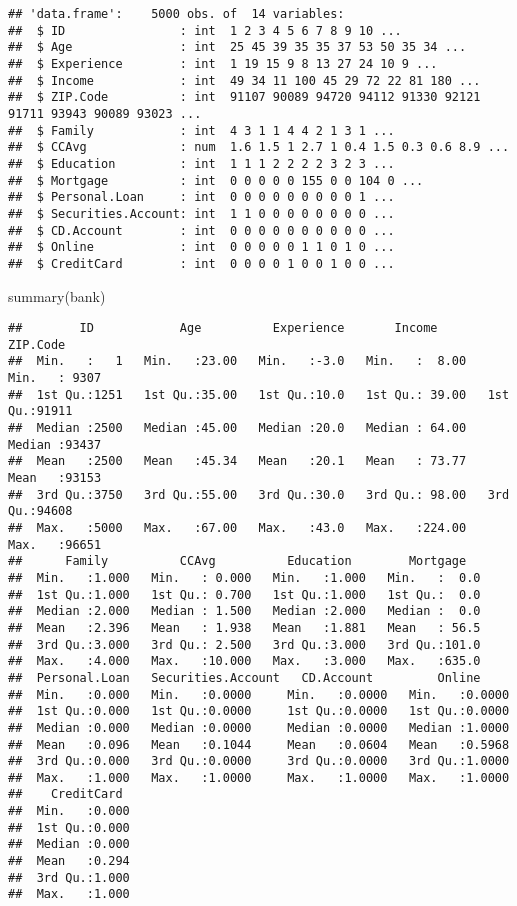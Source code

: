 \documentclass[
]{article}
\newenvironment{Shaded}{\begin{snugshade}}{\end{snugshade}}
\newcommand{\FunctionTok}[1]{\textcolor[rgb]{0.00,0.00,0.00}{#1}}
\newcommand{\NormalTok}[1]{#1}
\begin{document}
\begin{verbatim}
## 'data.frame':    5000 obs. of  14 variables:
##  $ ID                : int  1 2 3 4 5 6 7 8 9 10 ...
##  $ Age               : int  25 45 39 35 35 37 53 50 35 34 ...
##  $ Experience        : int  1 19 15 9 8 13 27 24 10 9 ...
##  $ Income            : int  49 34 11 100 45 29 72 22 81 180 ...
##  $ ZIP.Code          : int  91107 90089 94720 94112 91330 92121 91711 93943 90089 93023 ...
##  $ Family            : int  4 3 1 1 4 4 2 1 3 1 ...
##  $ CCAvg             : num  1.6 1.5 1 2.7 1 0.4 1.5 0.3 0.6 8.9 ...
##  $ Education         : int  1 1 1 2 2 2 2 3 2 3 ...
##  $ Mortgage          : int  0 0 0 0 0 155 0 0 104 0 ...
##  $ Personal.Loan     : int  0 0 0 0 0 0 0 0 0 1 ...
##  $ Securities.Account: int  1 1 0 0 0 0 0 0 0 0 ...
##  $ CD.Account        : int  0 0 0 0 0 0 0 0 0 0 ...
##  $ Online            : int  0 0 0 0 0 1 1 0 1 0 ...
##  $ CreditCard        : int  0 0 0 0 1 0 0 1 0 0 ...
\end{verbatim}

\begin{Shaded}
\begin{Highlighting}[]
\FunctionTok{summary}\NormalTok{(bank)}
\end{Highlighting}
\end{Shaded}

\begin{verbatim}
##        ID            Age          Experience       Income          ZIP.Code    
##  Min.   :   1   Min.   :23.00   Min.   :-3.0   Min.   :  8.00   Min.   : 9307  
##  1st Qu.:1251   1st Qu.:35.00   1st Qu.:10.0   1st Qu.: 39.00   1st Qu.:91911  
##  Median :2500   Median :45.00   Median :20.0   Median : 64.00   Median :93437  
##  Mean   :2500   Mean   :45.34   Mean   :20.1   Mean   : 73.77   Mean   :93153  
##  3rd Qu.:3750   3rd Qu.:55.00   3rd Qu.:30.0   3rd Qu.: 98.00   3rd Qu.:94608  
##  Max.   :5000   Max.   :67.00   Max.   :43.0   Max.   :224.00   Max.   :96651  
##      Family          CCAvg          Education        Mortgage    
##  Min.   :1.000   Min.   : 0.000   Min.   :1.000   Min.   :  0.0  
##  1st Qu.:1.000   1st Qu.: 0.700   1st Qu.:1.000   1st Qu.:  0.0  
##  Median :2.000   Median : 1.500   Median :2.000   Median :  0.0  
##  Mean   :2.396   Mean   : 1.938   Mean   :1.881   Mean   : 56.5  
##  3rd Qu.:3.000   3rd Qu.: 2.500   3rd Qu.:3.000   3rd Qu.:101.0  
##  Max.   :4.000   Max.   :10.000   Max.   :3.000   Max.   :635.0  
##  Personal.Loan   Securities.Account   CD.Account         Online      
##  Min.   :0.000   Min.   :0.0000     Min.   :0.0000   Min.   :0.0000  
##  1st Qu.:0.000   1st Qu.:0.0000     1st Qu.:0.0000   1st Qu.:0.0000  
##  Median :0.000   Median :0.0000     Median :0.0000   Median :1.0000  
##  Mean   :0.096   Mean   :0.1044     Mean   :0.0604   Mean   :0.5968  
##  3rd Qu.:0.000   3rd Qu.:0.0000     3rd Qu.:0.0000   3rd Qu.:1.0000  
##  Max.   :1.000   Max.   :1.0000     Max.   :1.0000   Max.   :1.0000  
##    CreditCard   
##  Min.   :0.000  
##  1st Qu.:0.000  
##  Median :0.000  
##  Mean   :0.294  
##  3rd Qu.:1.000  
##  Max.   :1.000
\end{verbatim}
\end{document}
